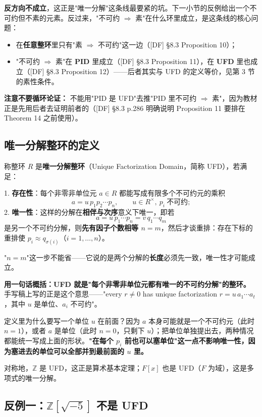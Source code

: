 \textbf{反方向不成立}，这正是"唯一分解"这条线最要紧的坑。下一小节的反例给出一个不可约但不素的元素。反过来，"不可约 $\Rightarrow$ 素"在什么环里成立，是这条线的核心问题：

\begin{itemize}
\item 在\textbf{任意整环}里只有"素 $\Rightarrow$ 不可约"这一边（[DF] §8.3 Proposition 10）；
\item "不可约 $\Rightarrow$ 素"在 \textbf{PID} 里成立（[DF] §8.3 Proposition 11），在 \textbf{UFD} 里也成立（[DF] §8.3 Proposition 12）——后者其实与 UFD 的定义等价，见第 3 节的素性条件。
\end{itemize}


\textbf{注意不要循环论证：} 不能用"PID 是 UFD"去推"PID 里不可约 $\Rightarrow$ 素"，因为教材正是先用后者去证明前者的（[DF] §8.3 p.286 明确说明 Proposition 11 要排在 Theorem 14 之前使用）。

\subsection{唯一分解整环的定义}


称整环 $R$ 是\textbf{唯一分解整环}（Unique Factorization Domain，简称 UFD），若满足：

1. \textbf{存在性}：每个非零非单位元 $a\in R$ 都能写成有限多个不可约元的乘积
\[
   a=u\,p_1p_2\cdots p_n,\qquad u\in R^\times,\ p_i\ \text{不可约};
\]
2. \textbf{唯一性}：这样的分解在\textbf{相伴与次序}意义下唯一，即若
\[
   a=u\,p_1\cdots p_n=v\,q_1\cdots q_m
\]
   是另一个不可约分解，则\textbf{先有因子个数相等 $n=m$}，然后才谈重排：存在下标的重排使 $p_i\approx q_{\sigma(i)}$（$i=1,\dots,n$）。

"$n=m$"这一步不能省——它说的是两个分解的\textbf{长度}必须先一致，唯一性才可能成立。

\textbf{用一句话概括：UFD 就是"每个非零非单位元都有唯一的不可约分解"的整环。} 手写稿上写的正是这个意思——"every $r\ne0$ has unique factorization $r=u\,a_1\cdots a_t$，其中 $u$ 是单位、$a_i$ 不可约"。

定义里为什么要写一个单位 $u$ 在前面？因为 $a$ 本身可能就是一个不可约元（此时 $n=1$），或者 $a$ 是单位（此时 $n=0$，只剩下 $u$）；把单位单独提出去，两种情况都能统一写成上面的形状。\textbf{"在每个 $p_i$ 前也可以塞单位"这一点不影响唯一性，因为塞进去的单位可以全部并到最前面的 $u$ 里。}

对称地，$\mathbb Z$ 是 UFD，这正是算术基本定理；$F[x]$ 也是 UFD（$F$ 为域），这是多项式的唯一分解。

\subsection{反例一：$\mathbb Z[\sqrt{-5}]$ 不是 UFD}


